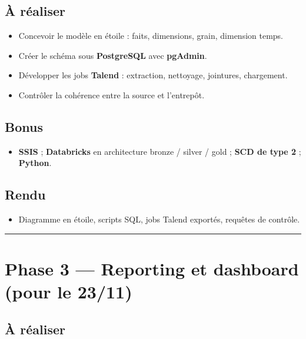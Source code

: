 \documentclass[11pt,a4paper]{article}
\providecommand{\tightlist}{\setlength{\itemsep}{0pt}\setlength{\parskip}{0pt}}
\begin{document}
\subsection{À réaliser}\label{uxe0-ruxe9aliser-1}

\begin{itemize}
\tightlist
\item
  Concevoir le modèle en étoile : faits, dimensions, grain, dimension
  temps.
\item
  Créer le schéma sous \textbf{PostgreSQL} avec \textbf{pgAdmin}.
\item
  Développer les jobs \textbf{Talend} : extraction, nettoyage,
  jointures, chargement.
\item
  Contrôler la cohérence entre la source et l'entrepôt.
\end{itemize}

\subsection{Bonus}\label{bonus-1}

\begin{itemize}
\tightlist
\item
  \textbf{SSIS} ; \textbf{Databricks} en architecture bronze / silver /
  gold ; \textbf{SCD de type 2} ; \textbf{Python}.
\end{itemize}

\subsection{Rendu}\label{rendu-1}

\begin{itemize}
\tightlist
\item
  Diagramme en étoile, scripts SQL, jobs Talend exportés, requêtes de
  contrôle.
\end{itemize}

\begin{center}\rule{0.5\linewidth}{0.5pt}\end{center}

\section{Phase 3 --- Reporting et dashboard (pour le
23/11)}\label{phase-3-reporting-et-dashboard-pour-le-2311}

\subsection{À réaliser}\label{uxe0-ruxe9aliser-2}
\end{document}
